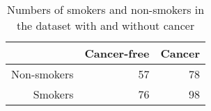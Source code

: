\begin{table}[ht]
\centering
\begin{tabular}{rrr}
  \hline
 & Cancer-free & Cancer \\ 
  \hline
Non-smokers & 57 & 78 \\ 
  Smokers & 76 & 98 \\ 
   \hline
\end{tabular}
\caption{Numbers of smokers and non-smokers in the dataset with and without cancer} 
\end{table}
